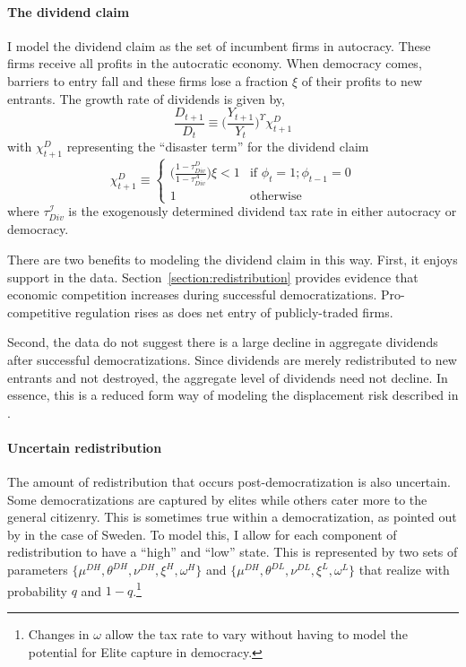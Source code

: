 \paragraph{The dividend claim}
I model the dividend claim as the set of incumbent firms in autocracy.  These firms receive all profits in the autocratic economy. When democracy comes, barriers to entry fall and these firms lose a fraction $\xi$ of their profits to new entrants.  The growth rate of dividends is given by, 
\begin{equation}
\frac{D_{t+1}}{D_{t}} \equiv \bigg(\frac{Y_{t+1}}{Y_{t}}\bigg)^{\Upsilon}\chi^D_{t+1}
\end{equation}
with $\chi^D_{t+1}$ representing the ``disaster term'' for the dividend claim
\begin{equation}
\chi^D_{t+1}\equiv \begin{cases} 
\bigg(\frac{1-\tau^D_{Div}}{1-\tau^A_{Div}}\bigg)\xi < 1 & \textrm{if }\phi_{t}=1;\phi_{t-1}=0 \\
1 & \textrm{otherwise}
\end{cases}
\end{equation}
where $\tau^\mathcal{I}_{Div}$ is the exogenously determined dividend tax rate in either autocracy or democracy.

There are two benefits to modeling the dividend claim in this way. First, it enjoys support in the data. Section~\ref{section:redistribution} provides evidence that economic competition increases during successful democratizations. Pro-competitive regulation rises as does net entry of publicly-traded firms.  

Second,  the data do not suggest there is a large decline in aggregate dividends after successful democratizations. Since dividends are merely redistributed to new entrants and not destroyed, the aggregate level of dividends need not decline. In essence, this is a reduced form way of modeling the displacement risk described in \cite*{Garleanu2012}.

\paragraph{Uncertain redistribution}
The amount of redistribution that occurs post-democratization is also uncertain. Some democratizations are captured by elites while others cater more to the general citizenry. This is sometimes true within a democratization, as pointed out by \cite{Hinnerich2014} in the case of Sweden. To model this, I allow for each component of redistribution to have a ``high'' and ``low'' state. This is represented by two sets of parameters $\{\mu^{DH},\theta^{DH},\nu^{DH}, \xi^{H},\omega^H\}$ and $\{\mu^{DH},\theta^{DL},\nu^{DL}, \xi^{L},\omega^L\}$ that realize with probability $q$ and $1-q$.\footnote{Changes in $\omega$ allow the tax rate to vary without having to model the potential for Elite capture in democracy.}

